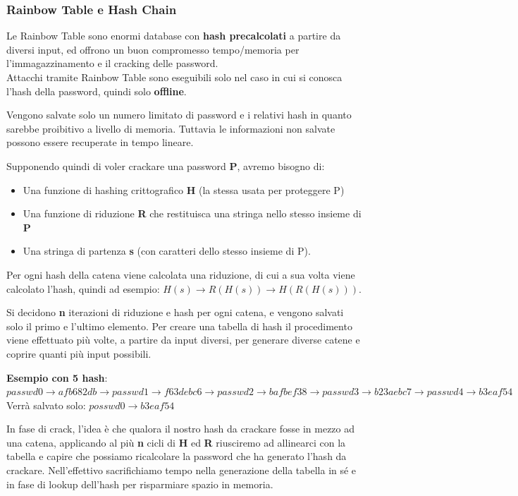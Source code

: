 \documentclass{article}
\begin{document}
\subsubsection{Rainbow Table e Hash Chain}
Le Rainbow Table sono enormi database con \textbf{hash precalcolati} a partire da diversi input, ed offrono un buon compromesso tempo/memoria per l’immagazzinamento e il cracking delle password.\\ Attacchi tramite Rainbow Table sono eseguibili solo nel caso in cui si conosca l'hash della password, quindi solo \textbf{offline}.

Vengono salvate solo un numero limitato di password e i relativi hash in quanto sarebbe proibitivo a livello di memoria. Tuttavia le informazioni non salvate possono essere recuperate in tempo lineare.

Supponendo quindi di voler crackare una password \textbf{P}, avremo bisogno di:
\begin{itemize}
    \item Una funzione di hashing crittografico \textbf{H} (la stessa usata per proteggere P)
    \item Una funzione di riduzione \textbf{R} che restituisca una stringa nello stesso insieme di \textbf{P}
    \item Una stringa di partenza \textbf{s} (con caratteri dello stesso insieme di P).
\end{itemize}

Per ogni hash della catena viene calcolata una riduzione, di cui a sua volta viene calcolato l’hash, quindi ad esempio: $H(s) \to R(H(s)) \to H(R(H(s)))$.

Si decidono \textbf{n} iterazioni di riduzione e hash per ogni catena, e vengono salvati solo il primo e l’ultimo elemento. Per creare una tabella di hash il procedimento viene effettuato più volte, a partire da input diversi, per generare diverse catene e coprire quanti più input possibili.

\textbf{Esempio con 5 hash}: $passwd0 \to afb682db \to passwd1 \to f63debc6 \to passwd2 \to bafbef38 \to passwd3 \to b23aebc7 \to passwd4 \to b3eaf54$\\
Verrà salvato solo: $posswd0 \to b3eaf54$

In fase di crack, l’idea è che qualora il nostro hash da crackare fosse in mezzo ad una catena, applicando al più \textbf{n} cicli di \textbf{H} ed \textbf{R} riusciremo ad allinearci con la tabella e capire che possiamo ricalcolare la password che ha generato l’hash da crackare. Nell'effettivo sacrifichiamo tempo nella generazione della tabella in sé e in fase di lookup dell'hash per risparmiare spazio in memoria.
\end{document}
